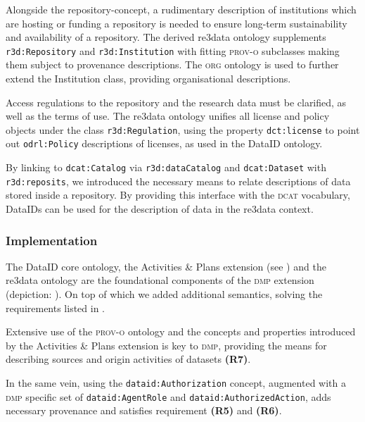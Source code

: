 \documentclass[runningheads,a4paper]{llncs}
\newcommand{\org}{{\scshape org}\xspace}
\newcommand{\prov}{{\scshape prov-o}\xspace}
\newcommand{\dcat}{{\scshape dcat}\xspace}
\newcommand{\dmp}{{\scshape dmp}\xspace}
\newcommand{\prop}[1]{{{\texttt{#1}}}}
\begin{document}
Alongside the repository-concept, a rudimentary description of institutions which are hosting or funding a repository is needed to ensure long-term sustainability and availability of a repository. The derived re3data ontology supplements \prop{r3d:Repository} and \prop{r3d:Institution} with fitting \prov subclasses
making them subject to provenance descriptions. The \org ontology is used to further extend the Institution class, providing organisational descriptions.

Access regulations to the repository and the research data must be clarified, as well as the terms of use. The re3data ontology unifies all license and policy objects under the class \prop{r3d:Regulation}, using the property \prop{dct:license} to point out \prop{odrl:Policy} descriptions of licenses, as used in the DataID ontology.

By linking to \prop{dcat:Catalog} via \prop{r3d:dataCatalog} and \prop{dcat:Dataset} with \prop{r3d:reposits}, we introduced the necessary means to relate descriptions of data stored inside a repository. By providing this interface with the \dcat vocabulary, DataIDs can be used for the description of data in the re3data context.


\subsubsection{Implementation}
\label{implDmp}
The DataID core ontology, the Activities \& Plans extension (see ) and the re3data ontology are the foundational components of the \dmp extension (depiction: ). On top of which we added additional semantics, solving the requirements listed in .

Extensive use of the \prov ontology and the concepts and properties introduced by the Activities \& Plans extension is key to \dmp, providing the means for describing sources and origin activities of datasets \textbf{(R7)}.

In the same vein, using the \prop{dataid:Authorization} concept, augmented with a \dmp specific set of \prop{dataid:AgentRole} and \prop{dataid:AuthorizedAction}, adds necessary provenance and satisfies requirement \textbf{(R5)} and \textbf{(R6)}.
\end{document}
